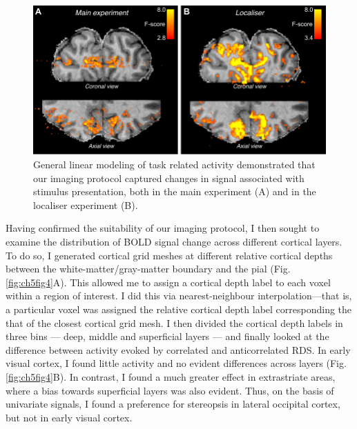 \begin{figure}
  \centering
  \includegraphics[keepaspectratio]{Fig3.pdf}
  \caption[General linear modeling of stimulus related activity.]{General linear modeling of task related activity demonstrated that our imaging protocol captured changes in signal associated with stimulus presentation, both in the main experiment (A) and in the localiser experiment (B).}
  \label{fig:ch5fig3}
\end{figure}

Having confirmed the suitability of our imaging protocol, I then sought to examine the distribution of BOLD signal change across different cortical layers. To do so, I generated cortical grid meshes at different relative cortical depths between the white-matter/gray-matter boundary and the pial (Fig. \ref{fig:ch5fig4}A). This allowed me to assign a cortical depth label to each voxel within a region of interest. I did this via nearest-neighbour interpolation---that is, a particular voxel was assigned the relative cortical depth label corresponding the that of the closest cortical grid mesh. I then divided the cortical depth labels in three bins --- deep, middle and superficial layers --- and finally looked at the difference between activity evoked by correlated and anticorrelated RDS. In early visual cortex, I found little activity and no evident differences across layers (Fig. \ref{fig:ch5fig4}B). In contrast, I found a much greater effect in extrastriate areas, where a bias towards superficial layers was also evident. Thus, on the basis of univariate signals, I found a preference for stereopsis in lateral occipital cortex, but not in early visual cortex.

